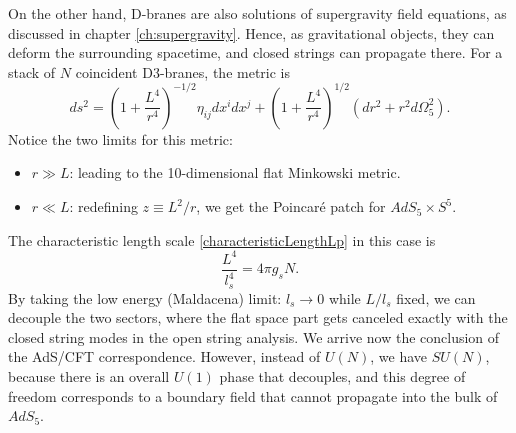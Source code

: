 On the other hand, D-branes are also solutions of supergravity field equations, as discussed in chapter \ref{ch:supergravity}.
Hence, as gravitational objects, they can deform the surrounding spacetime, and closed strings can propagate there.
For a stack of $N$ coincident D3-branes, the metric is
\begin{equation}
 ds^2 = \left( 1 + \dfrac{L^4}{r^4} \right)^{-1/2} \eta_{i j} dx^i dx^j  + \left( 1 + \dfrac{L^4}{r^4} \right)^{1/2} (dr^2 + r^2 d\Omega_5^2).
\end{equation}
Notice the two limits for this metric:
\begin{itemize}
 \item $r \gg L$: leading to the 10-dimensional flat Minkowski metric.
 \item $r \ll L$: redefining $z\equiv L^2 / r$, we get the Poincar\'e patch for $AdS_5 \times S^5$. 
\end{itemize} 
The characteristic length scale \eqref{characteristicLengthLp} in this case is
\begin{equation}
 \dfrac{L^4}{l_s^4} = 4 \pi g_s N.
\end{equation}
By taking the low energy (Maldacena) limit: $l_s \rightarrow 0$ while $L/l_s$ fixed, we can decouple the two sectors,
where the flat space part gets canceled exactly with the closed string modes in the open string analysis.
We arrive now the conclusion of the AdS/CFT correspondence.
However, instead of $U(N)$, we have $SU(N)$, because there is an overall $U(1)$ phase that decouples,
and this degree of freedom corresponds to a boundary field that cannot propagate into the bulk of $AdS_5$.



